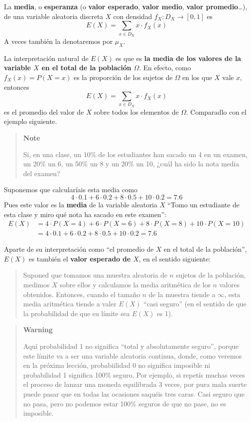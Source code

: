 \documentclass[
  spanish,
  letterpaper,
  DIV=11,
  numbers=noendperiod]{scrreprt}
\begin{document}
\begin{tcolorbox}
La \textbf{media}, o \textbf{esperanza} (o \textbf{valor esperado},
\textbf{valor medio}, \textbf{valor promedio}\ldots), de una variable
aleatoria discreta \(X\) con densidad \(f_X:D_X\to  [0,1]\) es \[
E(X)=\sum_{x\in D_X} x\cdot f_X(x)
\] A veces también la denotaremos por \(\mu_X\).

La interpretación natural de \(E(X)\) es que es \textbf{la media de los
valores de la variable \(X\) en el total de la población \(\Omega\)}. En
efecto, como \(f_X(x)=P(X=x)\) es la proporción de los sujetos de
\(\Omega\) en los que \(X\) vale \(x\), entonces \[
E(X)=\sum_{x\in D_X} x\cdot f_X(x)
\] es el promedio del valor de \(X\) sobre todos los elementos de
\(\Omega\). Comparadlo con el ejemplo siguiente.

\begin{quote}
\textbf{Note}

Si, en una clase, un 10\% de los estudiantes han sacado un 4 en un
examen, un 20\% un 6, un 50\% un 8 y un 20\% un 10, ¿cuál ha sido la
nota media del examen?
\end{quote}

Suponemos que calcularíais esta media como \[
4\cdot 0.1+6\cdot 0.2+8\cdot 0.5+10\cdot 0.2=7.6
\] Pues este valor es la \textbf{media} de la variable aleatoria \(X\)
``Tomo un estudiante de esta clase y miro qué nota ha sacado en este
examen'': \[
\begin{array}{rl}
E(X)\!\!\!\!\! &=4\cdot P(X=4)+6\cdot P(X=6)+8\cdot P(X=8)+10\cdot P(X=10)\\
& = 4\cdot 0.1+6\cdot 0.2+8\cdot 0.5+10\cdot 0.2=7.6
\end{array}
\]

Aparte de su interpretación como ``el promedio de \(X\) en el total de
la población'', \(E(X)\) es también el \textbf{valor esperado de \(X\)},
en el sentido siguiente:

\begin{quote}
Suponed que tomamos una muestra aleatoria de \(n\) sujetos de la
población, medimos \(X\) sobre ellos y calculamos la media aritmética de
los \(n\) valores obtenidos. Entonces, cuando el tamaño \(n\) de la
muestra tiende a \(\infty\), esta media aritmética tiende a valer
\(E(X)\) ``casi seguro'' (en el sentido de que la probabilidad de que su
límite sea \(E(X)\) es 1).
\end{quote}

\begin{quote}
\textbf{Warning}

Aquí probabilidad 1 no significa ``total y absolutamente seguro'',
porque este límite va a ser una variable aleatoria continua, donde, como
veremos en la próxima lección, probabiilidad 0 no significa imposible ni
probabilidad 1 significa 100\% seguro. Por ejemplo, si repetís muchas
veces el proceso de lanzar una moneda equilibrada 3 veces, por pura mala
suerte puede pasar que en todas las ocasiones saquéis tres caras. Casi
seguro que no pasa, pero no podemos estar 100\% seguros de que no pase,
no es imposible.
\end{quote}


\end{tcolorbox}
\end{document}
